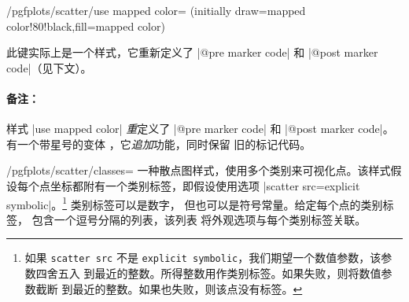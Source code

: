 {\begin{stylekey}{/pgfplots/scatter/use mapped color=
    (initially draw=mapped color!80!black,fill=mapped color)%
}
\begin{codeexample}[]
\end{codeexample}

%
\begin{codeexample}[]
\end{codeexample}
    此键实际上是一个样式，它重新定义了 |@pre marker code| 和
    |@post marker code|（见下文）。


    \paragraph{备注：}

    样式 |use mapped color| \emph{重}定义了 |@pre marker code| 和
    |@post marker code|。有一个带星号的变体
    ，它\emph{追加}功能，同时保留
    旧的标记代码。
\end{stylekey}

\begin{stylekey}{/pgfplots/scatter/classes=}
\label{pgfplots:scatterclasses}
    一种散点图样式，使用多个类别来可视化点。该样式假设每个点坐标都附有一个类别标签，即假设使用选项 |scatter src=explicit symbolic|。\footnote{如果 \texttt{scatter src} 不是
    \texttt{explicit symbolic}，我们期望一个数值参数，该参数四舍五入
    到最近的整数。所得整数用作类别标签。如果失败，则将数值参数截断
    到最近的整数。如果也失败，则该点没有标签。} 类别标签可以是数字，
    但也可以是符号常量。给定每个点的类别标签，
     包含一个逗号分隔的列表，该列表
    将外观选项与每个类别标签关联。


\end{stylekey}}
